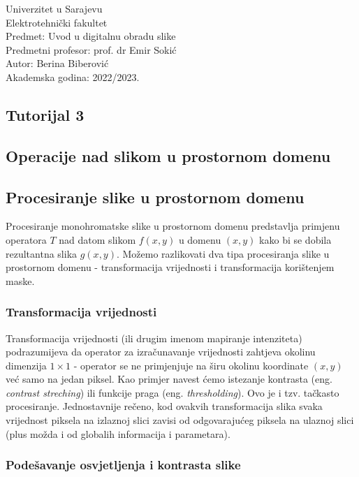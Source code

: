 \documentclass[a4paper, 12pt]{article}
\begin{document}
\noindent
Univerzitet u Sarajevu\\
Elektrotehnički fakultet\\
Predmet: Uvod u digitalnu obradu slike\\
Predmetni profesor: prof. dr Emir Sokić\\
Autor: Berina Biberović\\
Akademska godina: 2022/2023.


\begin{center}
    \section*{Tutorijal 3}
    \subsection*{Operacije nad slikom u prostornom domenu}
\end{center}

\subsection*{Procesiranje slike u prostornom domenu}

Procesiranje monohromatske slike u prostornom domenu predstavlja primjenu operatora $T$ nad datom slikom $f(x, y)$ u domenu $(x, y)$ kako bi se dobila rezultantna slika $g(x, y)$. Možemo razlikovati dva tipa procesiranja slike u prostornom domenu - transformacija vrijednosti i transformacija korištenjem maske.

\subsubsection*{Transformacija vrijednosti}

Transformacija vrijednosti (ili drugim imenom mapiranje intenziteta) podrazumijeva da operator za izračunavanje vrijednosti zahtjeva okolinu dimenzija $1 \times 1$ - operator se ne primjenjuje na širu okolinu koordinate $(x, y)$ već samo na jedan piksel. Kao primjer navest ćemo istezanje kontrasta (eng. \textit{contrast streching}) ili funkcije praga (eng. \textit{thresholding}). Ovo je i tzv. tačkasto procesiranje. Jednostavnije rečeno, kod ovakvih transformacija slika svaka vrijednost piksela na izlaznoj slici zavisi od odgovarajućeg piksela na ulaznoj slici (plus možda i od globalih informacija i parametara).

\subsubsection*{Podešavanje osvjetljenja i kontrasta slike}
\end{document}
